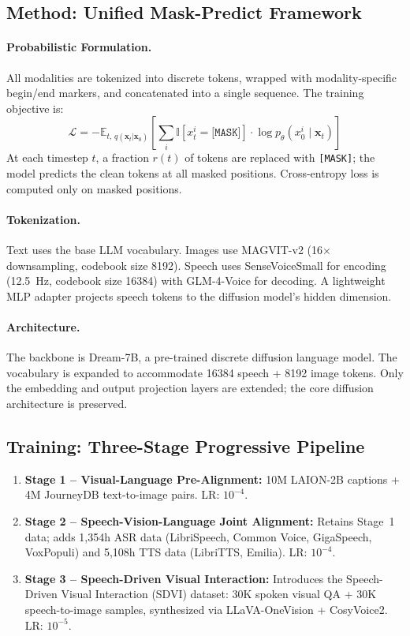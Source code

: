 \documentclass[11pt]{article}
\begin{document}
\subsection{Method: Unified Mask-Predict Framework}

\paragraph{Probabilistic Formulation.} All modalities are tokenized into discrete tokens, wrapped with modality-specific begin/end markers, and concatenated into a single sequence. The training objective is:
\begin{equation}
    \mathcal{L} = -\mathbb{E}_{t,\, q(\mathbf{x}_t|\mathbf{x}_0)}\left[\sum_{i} \mathbb{I}[x_t^i = \texttt{[MASK]}] \cdot \log p_\theta(x_0^i \mid \mathbf{x}_t)\right]
\end{equation}
At each timestep $t$, a fraction $r(t)$ of tokens are replaced with \texttt{[MASK]}; the model predicts the clean tokens at all masked positions. Cross-entropy loss is computed only on masked positions.

\paragraph{Tokenization.} Text uses the base LLM vocabulary. Images use MAGVIT-v2 (16$\times$ downsampling, codebook size 8192). Speech uses SenseVoiceSmall for encoding (12.5~Hz, codebook size 16384) with GLM-4-Voice for decoding. A lightweight MLP adapter projects speech tokens to the diffusion model's hidden dimension.

\paragraph{Architecture.} The backbone is Dream-7B, a pre-trained discrete diffusion language model. The vocabulary is expanded to accommodate 16384 speech + 8192 image tokens. Only the embedding and output projection layers are extended; the core diffusion architecture is preserved.

\subsection{Training: Three-Stage Progressive Pipeline}

\begin{enumerate}
    \item \textbf{Stage 1 -- Visual-Language Pre-Alignment:} 10M LAION-2B captions + 4M JourneyDB text-to-image pairs. LR: $10^{-4}$.
    \item \textbf{Stage 2 -- Speech-Vision-Language Joint Alignment:} Retains Stage~1 data; adds 1,354h ASR data (LibriSpeech, Common Voice, GigaSpeech, VoxPopuli) and 5,108h TTS data (LibriTTS, Emilia). LR: $10^{-4}$.
    \item \textbf{Stage 3 -- Speech-Driven Visual Interaction:} Introduces the Speech-Driven Visual Interaction (SDVI) dataset: 30K spoken visual QA + 30K speech-to-image samples, synthesized via LLaVA-OneVision + CosyVoice2. LR: $10^{-5}$.
\end{enumerate}
\end{document}
